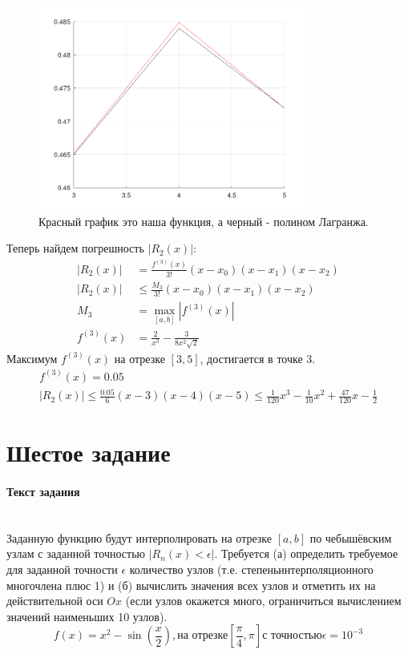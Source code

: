 
\begin{figure}[h]
  \caption{Красный график это наша функция, а черный - полином Лагранжа.}
  \centering
  \includegraphics[width=0.8\textwidth]{images/task_5.png}
\end{figure}

Теперь найдем погрешность $|R_{2}(x)|$:\\[2mm]
\begin{align*}
  |R_{2}(x)| &= \frac{f^{(3)}(x)}{3!}(x-x_{0})(x-x_{1})(x-x_{2}) \\[1mm]
  |R_{2}(x)| & \leq \frac{M_{3}}{3!}(x-x_{0})(x-x_{1})(x-x_{2}) \\[1mm]
  M_{3} &= \max_{\left[a, b\right]}|f^{(3)}(x)| \\[1mm]
  f^{(3)}(x) & = \frac{2}{x^{3}} - \frac{3}{8x^{2}\sqrt{2}}
\end{align*}
Максимум $f^{(3)}(x)$ на отрезке $[3, 5]$, достигается в точке $3$.
\begin{gather*}
  f^{(3)}(x) = 0.05 \\[1mm]
  |R_{2}(x)| \leq \frac{0.05}{6}(x-3)(x-4)(x-5) \leq \frac{1}{120}x^{3} - \frac{1}{10}x^{2} + \frac{47}{120}x - \frac{1}{2}
\end{gather*}
\section{Шестое задание}

\paragraph{Текст задания} ~\\
Заданную функцию будут интерполировать на отрезке $\left[a, b\right]$ по чебышёвским узлам с заданной точностью $|R_{n}(x) < \epsilon|$. Требуется (а) определить требуемое для заданной точности $\epsilon$ количество узлов (т.е. степеньинтерполяционного многочлена плюс 1) и (б) вычислить значения всех узлов и отметить их на действительной оси $Ox$ (если узлов окажется много, ограничиться вычислением значений наименьших 10 узлов).\\[3mm]
\[
  f(x) = x^{2} - \sin\left(\frac{x}{2}\right), \text{на отрезке} \left[\frac{\pi}{4}, \pi\right] \text{с точностью} \epsilon = 10^{-3}
\]
